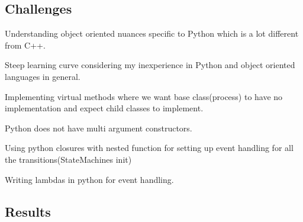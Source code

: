 \subsection*{Challenges }


\begin{DoxyEnumerate}
\item Understanding object oriented nuances specific to Python which is a lot different from C++.
\item Steep learning curve considering my inexperience in Python and object oriented languages in general.
\item Implementing virtual methods where we want base class(process) to have no implementation and expect child classes to implement.
\item Python does not have multi argument constructors.
\item Using python closures with nested function for setting up event handling for all the transitions(State\+Machine\textquotesingle{}s init)
\item Writing lambdas in python for event handling.
\end{DoxyEnumerate}

\subsection*{Results }


